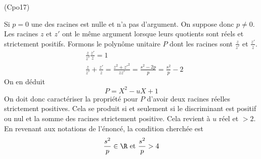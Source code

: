 \begin{tiny}(Cpo17)\end{tiny} Si $p=0$ une des racines est nulle et n'a pas d'argument. On suppose donc $p\neq 0$. \newline
Les racines $z$ et $z'$ ont le même argument lorsque leurs quotients sont réels et strictement positifs. Formons le polynôme unitaire $P$ dont les racines sont $\frac{z}{z'}$ et $\frac{z'}{z}$.
\begin{align*}
 &\frac{z}{z'} \frac{z'}{z}=1 \\
 &\frac{z}{z'}+\frac{z'}{z}=\frac{z^2+z'^2}{zz'}
= \frac{s^2-2p}{p}=\frac{s^2}{p}-2
\end{align*}
On en déduit 
\begin{displaymath}
 P = X^2 -u X +1
\end{displaymath}
On doit donc caractériser la propriété pour $P$ d'avoir deux racines réelles strictement positives. Cela se produit si et seulement si le discriminant est positif ou nul et la somme des racines strictement positive. Cela revient à $u$ réel et $>2$. En revenant aux notations de l'énoncé, la condition cherchée est
\begin{displaymath}
 \frac{s^2}{p}\in\R\text{ et } \frac{s^2}{p}>4
\end{displaymath}
